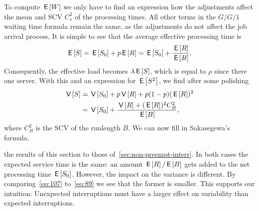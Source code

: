 To compute $\,\mathsf{E}\left[W\right]$ we only have to find an expression how the adjustments affect the mean and SCV $C_s^2$ of the processing times.
All other terms in the $G/G/1$ waiting time formula remain the same, as the adjustments do not affect the job arrival process,
It is simple to see that the average effective processing time is
\begin{equation} \label{eq:88}
 \,\mathsf{E}\left[S\right] = \,\mathsf{E}\left[S_0\right] + p \,\mathsf{E}\left[R\right] = \,\mathsf{E}\left[S_0\right] + \frac{\,\mathsf{E}\left[R\right]}{\,\mathsf{E}\left[B\right]}. 
\end{equation}
Consequently, the effective   load becomes $\lambda \,\mathsf{E}\left[S\right]$, which is equal to $\rho$ since there one server.
With this and an expression for $\,\mathsf{E}\left[S^2\right]$, we find after some polishing 
\begin{equation}\label{eq:89} 
  \begin{split}
 \,\mathsf{V}\left[S\right] 
&= \,\mathsf{V}\left[S_0\right] + p\,\mathsf{V}\left[R\right] + p (1-p)(\,\mathsf{E}\left[R\right])^2 \\
&= \,\mathsf{V}\left[S_0\right] + \frac{\,\mathsf{V}\left[R\right] +(\,\mathsf{E}\left[R\right])^2C_B^2}{\,\mathsf{E}\left[B\right]},
  \end{split}
\end{equation}
where $C_B^2$ is the SCV of the runlength $B$. We can now  fill in Sakasegewa's formula. 


 the results of this section to those of~\cref{sec:non-preempt-interr}.
In both cases the expected service time is the same: an amount $\,\mathsf{E}\left[R\right]/ \,\mathsf{E}\left[B\right]$ gets added to the net processing time $\,\mathsf{E}\left[S_0\right]$.
However, the impact on the variance is different.
By comparing~\cref{eq:107} to~\cref{eq:89} we see that the former is smaller.
This supports our intuition: Unexpected interruptions must have a larger effect on variability than expected interruptions.



